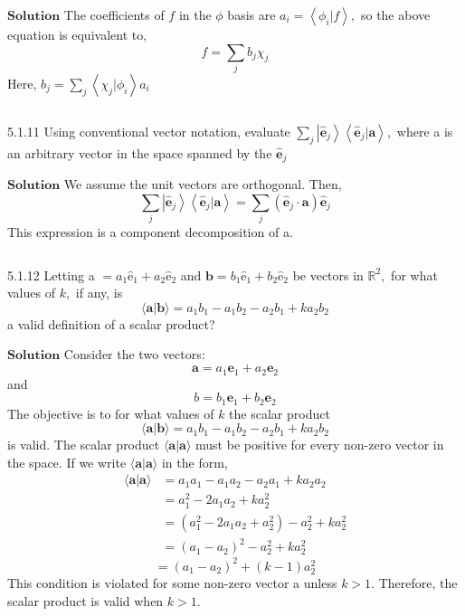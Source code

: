 $\boxed{\textbf{Solution}}$ The coefficients of $f$ in the $\phi$ basis are $a_{i}=\left\langle\phi_{i} | f\right\rangle,$ so the above equation is equivalent to,
$$
f=\sum_{j} b_{j} \chi_{j}
$$
Here, $b_{j}=\sum_{j}\left\langle\chi_{j} | \phi_{i}\right\rangle a_{i}$

$$$$

\begin{mybox}{5.1.11}
Using conventional vector notation, evaluate $\sum_{j}\left|\hat{\mathbf{e}}_{j}\right\rangle\left\langle\hat{\mathbf{e}}_{j} | \mathbf{a}\right\rangle,$ where a is an arbitrary vector in the space spanned by the $\hat{\mathbf{e}}_{j}$
\end{mybox}

$\boxed{\textbf{Solution}}$  We assume the unit vectors are orthogonal. Then,
$$
\sum_{j}\left|\hat{\mathbf{e}}_{j}\right\rangle\left\langle\hat{\mathbf{e}}_{j} | \mathbf{a}\right\rangle=\sum_{j}\left(\hat{\mathbf{e}}_{j} \cdot \mathbf{a}\right) \hat{\mathbf{e}}_{j}
$$
This expression is a component decomposition of a.

$$$$

\begin{mybox}{5.1.12}
Letting a $=a_{1} \hat{\mathrm{e}}_{1}+a_{2} \hat{\mathrm{e}}_{2}$ and $\mathbf{b}=b_{1} \hat{\mathrm{e}}_{1}+b_{2} \hat{\mathrm{e}}_{2}$ be vectors in $\mathbb{R}^{2},$ for what values of $k,$ if
any, is
$$
\langle\mathbf{a} | \mathbf{b}\rangle=a_{1} b_{1}-a_{1} b_{2}-a_{2} b_{1}+k a_{2} b_{2}
$$
a valid definition of a scalar product?
\end{mybox}

$\boxed{\textbf{Solution}}$ Consider the two vectors:
$$\mathbf{a}=a_{1} \mathbf{e}_{1}+a_{2} \mathbf{e}_{2}$$ 
and 
$$b=b_{1} \mathbf{e}_{1}+b_{2} \mathbf{e}_{2}$$
The objective is to for what values of $k$ the scalar product 
$$\langle\mathbf{a} | \mathbf{b}\rangle=a_{1} b_{1}-a_{1} b_{2}-a_{2} b_{1}+k a_{2} b_{2}$$
is valid. The scalar product $\langle\mathbf{a} | \mathbf{a}\rangle$ must be positive for every non-zero vector in the space. If we write
$\langle\mathbf{a} | \mathbf{a}\rangle$ in the form,
$$
\begin{aligned}
\langle\mathbf{a} | \mathbf{a}\rangle &=a_{1} a_{1}-a_{1} a_{2}-a_{2} a_{1}+k a_{2} a_{2} \\
&=a_{1}^{2}-2 a_{1} a_{2}+k a_{2}^{2} \\
&=\left(a_{1}^{2}-2 a_{1} a_{2}+a_{2}^{2}\right)-a_{2}^{2}+k a_{2}^{2} \\
&=\left(a_{1}-a_{2}\right)^{2}-a_{2}^{2}+k a_{2}^{2}
\end{aligned}
$$
$$
=\left(a_{1}-a_{2}\right)^{2}+(k-1) a_{2}^{2}
$$
This condition is violated for some non-zero vector a unless $k>1$.
Therefore, the scalar product is valid when $k>1$.
